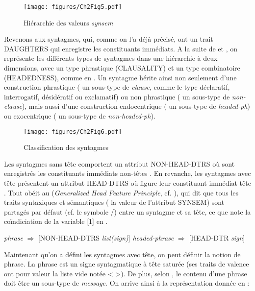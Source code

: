 \begin{figure} 

   \texttt{[image: figures/Ch2Fig5.pdf]}

\caption{Hiérarchie des valeurs \textit{synsem}}
\label{ch2:fig5}
\end{figure}

Revenons aux syntagmes, qui, comme on l’a déjà précisé, ont un trait DAUGHTERS qui enregistre les constituants immédiats. A la suite de \citet{Sag1997} et \citet{GinzburgEtAl2000}, on représente les différents types de syntagmes dans une hiérarchie à deux dimensions, avec un type phrastique (CLAUSALITY) et un type combinatoire (HEADEDNESS), comme en . Un syntagme hérite ainsi non seulement d’une construction phrastique ({\cad} un sous-type de \textit{clause}, comme le type déclaratif, interrogatif, désidératif ou exclamatif) ou non phras\-tique ({\cad} un sous-type de \textit{non-clause}), mais aussi d’une construction endocentrique ({\cad} un sous-type de \textit{headed-ph}) ou exocentrique ({\cad} un sous-type de \textit{non-headed-ph}).  

\begin{figure} 

   \texttt{[image: figures/Ch2Fig6.pdf]}

\caption{Classification des syntagmes}
\label{ch2:fig6}
\end{figure}

Les syntagmes sans tête comportent un attribut NON-HEAD-DTRS où sont enregistrés les constituants immédiats non-têtes . En revanche, les syntagmes avec tête présentent un attribut HEAD-DTRS où figure leur constituant immédiat tête . Tout  obéit au  (\textit{Generalized Head Feature Principle}, cf. \citealt{GinzburgEtAl2000}), qui dit que tous les traits syntaxiques et sémantiques ({\cad} la valeur de l’attribut SYNSEM) sont partagés par défaut (cf. le symbole /) entre un syntagme et sa tête, ce que note la coïndiciation de la variable [1] en .

\ea
\ea \textit{phrase} $\Rightarrow$ [NON-HEAD-DTRS \textit{list(sign)}] \label{ch2:ex248a}    
\ex  \textit{headed-phrase} $\Rightarrow$ [HEAD-DTR \textit{sign}] \label{ch2:ex248b}
\z
\z

Maintenant qu’on a défini les syntagmes avec tête, on peut définir la notion de phrase. La phrase est un signe syntagmatique à tête saturée (ses traits de valence ont pour valeur la liste vide notée < >). De plus, selon \citet{GinzburgEtAl2000}, le contenu d’une phrase doit être un sous-type de \textit{message}. On arrive ainsi à la représentation donnée en  :

